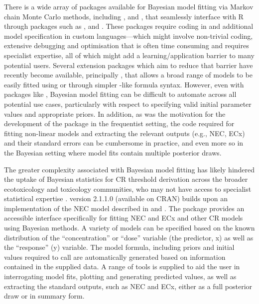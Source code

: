 \documentclass[
  shortnames]{jss}
\begin{document}
There is a wide array of packages available for Bayesian model fitting via Markov chain Monte Carlo methods, including  \citep{Lunn2000},  \citep{Plummer2003} and  \citep{Carpenter2017}, that seamlessly interface with R through packages such as ,  \citep{Su2015} and  \citep{rstan2021}. These packages require coding in  and additional model specification in custom languages---which might involve non-trivial coding, extensive debugging and optimisation that is often time consuming and requires specialist expertise, all of which might add a learning/application barrier to many potential users. Several extension packages which aim to reduce that barrier have recently become available, principally  \citep{Burkner2017}, that allows a broad range of models to be easily fitted using  \citep{rstan2021} or  \citep{cmdstanr2022} through simpler -like formula syntax. However, even with packages like , Bayesian model fitting can be difficult to automate across all potential use cases, particularly with respect to specifying valid initial parameter values and appropriate priors. In addition, as was the motivation for the development of the  package in the frequentist setting, the  code required for fitting non-linear models and extracting the relevant outputs (e.g., NEC, ECx) and their standard errors can be cumbersome in practice, and even more so in the Bayesian setting where model fits contain multiple posterior draws.

The greater complexity associated with Bayesian model fitting has likely hindered the uptake of Bayesian statistics for CR threshold derivation across the broader ecotoxicology and toxicology communities, who may not have access to specialist statistical expertise \citep{Fisher2019}.  version 2.1.1.0 (available on CRAN) builds upon an implementation of the NEC model described in \citet{Fox2010} and \citet{Pires2002}. The  package provides an accessible interface specifically for fitting NEC and ECx and other CR models using Bayesian methods. A variety of models can be specified based on the known distribution of the ``concentration'' or ``dose'' variable (the predictor, x) as well as the ``response'' (y) variable. The model formula, including priors and initial values required to call  are automatically generated based on information contained in the supplied data. A range of tools is supplied to aid the user in interrogating model fits, plotting and generating predicted values, as well as extracting the standard outputs, such as NEC and ECx, either as a full posterior draw or in summary form.
\end{document}
